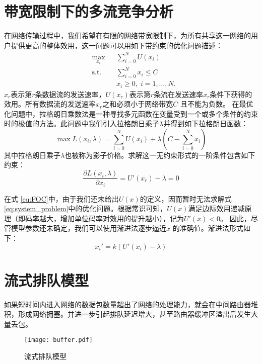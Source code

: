 \section{带宽限制下的多流竞争分析}
\label{section:shadow_price}

在网络传输过程中，我们希望在有限的网络带宽限制下，为所有共享这一网络的用户提供更高的整体效用，这一问题可以用如下带约束的优化问题描述：
\begin{equation}
\label{eq:system_problem}
\begin{aligned}
& \max_{x_i}
& & \sum_{i=0}^N{U(x_i)} \\
& \text{s.t.}
& & \sum_{i=0}^N{x_i} \leq C \\
&&& x_i \geq 0, \; i = 1, \ldots, N.
\end{aligned}
\end{equation}
$x_r$表示第$r$条数据流的发送速率，$U(x_r)$表示第$r$条流在发送速率$x_r$条件下获得的效用。所有数据流的发送速率$x_r$之和必须小于网络带宽$C$ 且不能为负数。
在最优化问题中，拉格朗日乘数法是一种寻找多元函数在变量受到一个或多个条件的约束时的极值的方法。此问题中我们引入拉格朗日乘子$\lambda$并得到如下拉格朗日函数：
\begin{equation}
\label{eq:lagrangian}
  \max L(x_i, \lambda) = \sum_{i=0}^N{U(x_i)} + \lambda (C-\sum_{i=0}^N{x_i})
\end{equation}
其中拉格朗日乘子$\lambda$也被称为影子价格。求解这一无约束形式的一阶条件包含如下约束：
\begin{equation}
\label{eq:FOC}
  \frac{\partial L(x_i, \lambda)}{\partial x_i} = U'(x_r) - \lambda = 0
\end{equation}

在式 \ref{eq:FOC}中，由于我们还未给出$U(x)$的定义，因而暂时无法求解式 \ref{eq:system_problem}中的优化问题。根据常识可知，$U(x)$满足边际效用递减原理（即码率越大，增加单位码率对效用的提升越小），记为$U'(x) < 0$。 因此，尽管模型参数还未确定，我们可以使用渐进法逐步逼近$x$ 的准确值。渐进法形式如下：
\begin{equation}
\label{eq:approach}
  x_i' = k ( U'(x_i) - \lambda)
\end{equation}


\section{流式排队模型}
如果短时间内进入网络的数据包数量超出了网络的处理能力，就会在中间路由器堆积，形成网络拥塞。并进一步引起排队延迟增大，甚至路由器缓冲区溢出后发生大量丢包。

\begin{figure}[htbp]
  \centering
  \texttt{[image: buffer.pdf]}
  \caption{流式排队模型}
  \label{fig:buffer}
\end{figure}

